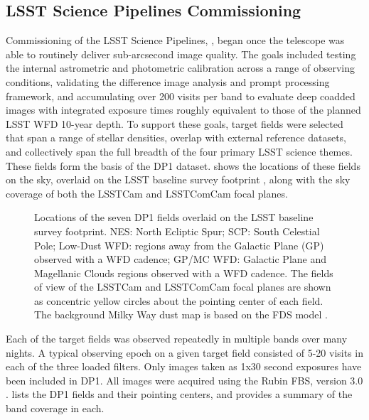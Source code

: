 \subsection{LSST Science Pipelines Commissioning}
\label{ssec:pipelines_commissioning}
Commissioning of the LSST Science Pipelines, \citep{PSTN-019},  began once the telescope was able to routinely deliver sub-arcsecond image quality.
The goals included testing the internal astrometric and photometric calibration across a range of observing conditions, 
validating the difference image analysis and prompt processing \citep{dmtn-219} framework, and accumulating over 200 visits per band to evaluate 
deep coadded images with integrated exposure times roughly equivalent to those of the planned LSST \gls{WFD} 10-year depth.
To support these goals, \nfields target fields were selected that span a range of stellar densities, overlap with external reference datasets, and collectively span the full breadth of the four primary \gls{LSST} science themes.
These \nfields fields form the basis of the \gls{DP1} dataset.
 shows the locations of these \nfields fields on the sky, overlaid on the LSST baseline survey footprint \citep{PSTN-051, PSTN-052, PSTN-053, PSTN-055, PSTN-056}, along with the sky coverage of both the \gls{LSSTCam} and \gls{LSSTComCam} focal planes.
\begin{figure}[bt!]
\centering
{}
\caption{Locations of the seven \gls{DP1} fields overlaid on the \gls{LSST} baseline survey footprint. NES: North Ecliptic Spur; SCP: South Celestial Pole; Low-Dust \gls{WFD}: regions away from the Galactic Plane (GP) observed with a \gls{WFD} cadence; GP/MC \gls{WFD}: Galactic Plane and Magellanic Clouds regions observed with a \gls{WFD} cadence. The fields of view of the \gls{LSSTCam} and \gls{LSSTComCam} focal planes are shown as concentric yellow circles about the pointing center of each field. The background Milky Way dust map is based on the FDS model \citep{1999ApJ...524..867F}.}
\label{fig:dp1_fields_on_sky}
\end{figure}
Each of the \nfields target fields was observed repeatedly in multiple bands over many nights.
A typical observing \gls{epoch} on a given target field consisted of 5-20 visits in each of the three loaded filters.
Only images taken as 1x30 second exposures have been included in \gls{DP1}.
All images were acquired using the Rubin \gls{FBS}, version 3.0 \citep{Naghib_2019, peter_yoachim_2024_13985198}.
 lists the \nfields \gls{DP1} fields and their pointing centers, and provides a summary of the band coverage in each.

